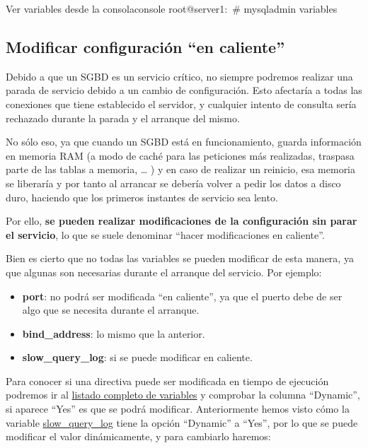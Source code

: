 \begin{mycode}{Ver variables desde la consola}{console}{}
root@server1:~# mysqladmin  variables
\end{mycode}

\subsection{Modificar configuración “en caliente”}
Debido a que un SGBD es un servicio crítico, no siempre podremos realizar una parada de servicio debido a un cambio de configuración. Esto afectaría a todas las conexiones que tiene establecido el servidor, y cualquier intento de consulta sería rechazado durante la parada y el arranque del mismo.

No sólo eso, ya que cuando un SGBD está en funcionamiento, guarda información en memoria RAM (a modo de caché para las peticiones más realizadas, traspasa parte de las tablas a memoria, … ) y en caso de realizar un reinicio, esa memoria se liberaría y por tanto al arrancar se debería volver a pedir los datos a disco duro, haciendo que los primeros instantes de servicio sea lento.

Por ello, \textbf{se pueden realizar modificaciones de la configuración sin parar el servicio}, lo que se suele denominar “hacer modificaciones en caliente”.

Bien es cierto que no todas las variables se pueden modificar de esta manera, ya que algunas son necesarias durante el arranque del servicio. Por ejemplo:

\begin{itemize}
    \item \textbf{port}: no podrá ser modificada “en caliente”, ya que el puerto debe de ser algo que se necesita durante el arranque.
    \item \textbf{bind\_address}: lo mismo que la anterior.
    \item \textbf{slow\_query\_log}:  si se puede modificar en caliente.
\end{itemize}

Para conocer si una directiva puede ser modificada en tiempo de ejecución podremos ir al \href{https://dev.mysql.com/doc/refman/8.0/en/server-option-variable-reference.html}{listado completo de variables} y comprobar la columna “Dynamic”, si aparece “Yes” es que se podrá modificar. Anteriormente hemos visto cómo la variable \href{https://dev.mysql.com/doc/refman/8.0/en/server-system-variables.html#sysvar_slow_query_log}{slow\_query\_log} tiene la opción “Dynamic” a “Yes”, por lo que se puede modificar el valor dinámicamente, y para cambiarlo haremos:

